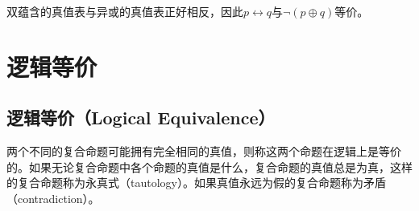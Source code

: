 \documentclass[12pt, openany, oneside]{book}
\begin{document}
\begin{table}[H]
    \centering
    \caption{双向蕴含真值表}
\end{table}

双蕴含的真值表与异或的真值表正好相反，因此$ p \leftrightarrow q $与$ \neg (p \oplus q) $等价。

\newpage

\section{逻辑等价}

\subsection{逻辑等价（Logical Equivalence）}

两个不同的复合命题可能拥有完全相同的真值，则称这两个命题在逻辑上是等价的。如果无论复合命题中各个命题的真值是什么，复合命题的真值总是为真，这样的复合命题称为永真式（tautology）。如果真值永远为假的复合命题称为矛盾（contradiction）。

\begin{table}[H]
    \centering
    \caption{逻辑等价}
\end{table}
\end{document}
